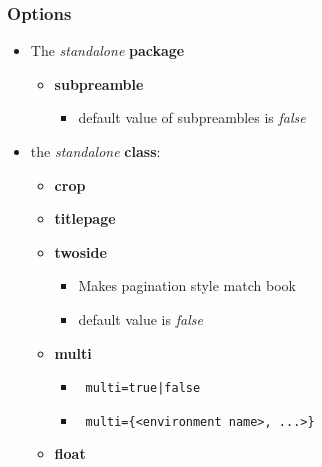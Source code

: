 \subsubsection[Options]{\Large Options}
\begin{itemize}
\item The \emph{standalone} \textbf{package}

\begin{itemize}

\item \begin{large}\textbf{subpreamble}\end{large}

\begin{itemize}
\item default value of subpreambles is \emph{false}

\end{itemize}

\end{itemize}

\item the \emph{standalone} \textbf{class}:
\begin{itemize}
\item \begin{large}\textbf{crop}\end{large}
\item \begin{large}\textbf{titlepage}\end{large}
\item \begin{large}\textbf{twoside}\end{large}

\begin{itemize}
\item Makes pagination style match book
\item default value is \emph{false}

\end{itemize}
\item \begin{large}\textbf{multi}\end{large}

\begin{itemize}
\item \begin{verbatim} multi=true|false \end{verbatim}
\item \begin{verbatim} multi={<environment name>, ...>}\end{verbatim}
\end{itemize}

\item \begin{large}\textbf{float}\end{large}
\end{itemize}

\end{itemize}

